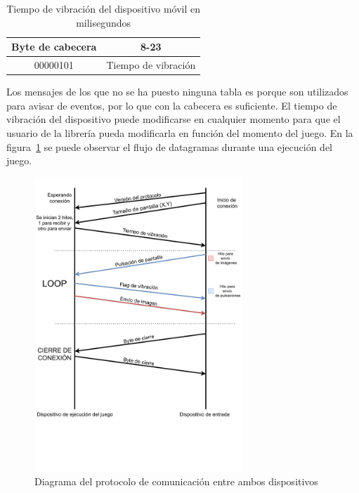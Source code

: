 
\begin{table}[h!]
\centering
\begin{tabular}{|c|c|} 
\hline
Byte de cabecera                                     & 8-23                   \\
\hline
\multicolumn{1}{|c|}{00000101} & \multicolumn{1}{c|}{Tiempo de vibraci\'on}  \\
\hline
\end{tabular}
\caption{Tiempo de vibraci\'on del dispositivo m\'ovil en milisegundos}
\label{table:3}
\end{table}


Los mensajes de los que no se ha puesto ninguna tabla es porque son utilizados para avisar de eventos, por lo que con la cabecera es suficiente. El tiempo de vibraci\'on del dispositivo puede modificarse en cualquier momento para que el usuario de la librer\'ia pueda modificarla en funci\'on del momento del juego. En la figura~\ref{Fig:protocolo} se puede observar el flujo de datagramas durante una ejecuci\'on del juego.\\

\begin{figure}[h]

\centering
\includegraphics[width=0.7\textwidth]{./Imagenes/Vectorial/Arquitectura}
\caption{Diagrama del protocolo de comunicaci\'on entre ambos dispositivos}
\label{Fig:protocolo}
\end{figure}

